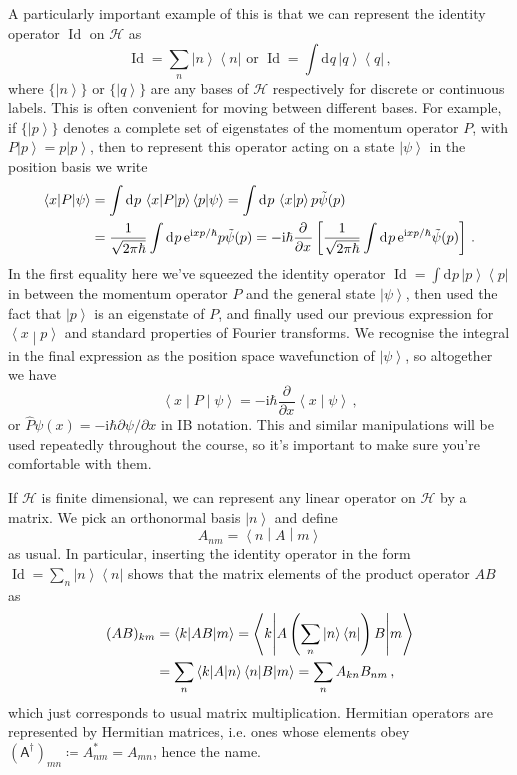 \documentclass{article}
\theoremstyle{plain}\theoremheaderfont{\normalfont\itshape}\theorembodyfont{\rmfamily}\theoremseparator{.}\newtheorem*{rem}{Remark}\newtheorem*{ex}{Example}\newtheorem*{proof}{Proof}\newtheorem*{altp}{Alternative proof}
\theoremstyle{plain}\theoremheaderfont{\normalfont\bfseries}\theorembodyfont{\rmfamily}\theoremseparator{.}\newtheorem{thm}{Theorem}[section]\newtheorem{lem}[thm]{Lemma}\newtheorem{prop}[thm]{Proposition}\newtheorem*{cor}{Corollary}\newtheorem{defn}[thm]{Definition}\newtheorem{clm}[thm]{Claim}\newtheorem{clminproof}{Claim}
\theoremstyle{break}\theoremheaderfont{\normalfont\itshape}\theorembodyfont{\rmfamily}\theoremseparator{.\medskip}\newtheorem*{proofskip}{Proof}\newtheorem*{exs}{Examples}\newtheorem*{rems}{Remarks}
\theoremstyle{break}\theoremheaderfont{\normalfont\bfseries}\theorembodyfont{\rmfamily}\theoremseparator{.\medskip}\newtheorem{lemskip}[thm]{Lemma}\newtheorem{defnskip}[thm]{Definition}\newtheorem{propskip}[thm]{Proposition}\newtheorem{thmskip}[thm]{Theorem}
\numberwithin{equation}{section}
\newcommand{\ii}{\mathrm{i}}
\newcommand{\ee}{\mathrm{e}}
\newcommand{\dd}[2][]{\mathrm{d}^{#1} #2\,}
\newcommand{\pdv}[3][]{\frac{\partial^{#1} #2}{{\partial #3}^{#1}}}
\newcommand{\bra}[1]{\left\langle #1 \right|}
\newcommand{\ket}[1]{\left| #1 \right\rangle}
\newcommand{\braket}[2]{\left\langle #1 \middle| #2 \right\rangle}
\newcommand{\mel}[3]{\left\langle #1 \middle| #2 \middle| #3 \right\rangle}
\newcommand{\hb}{\mathcal{H}}
\DeclareMathOperator{\Id}{Id}
\begin{document}
    A particularly important example of this is that we can represent the identity operator \(\Id\) on \(\hb\) as
    \begin{equation}
        \Id=\sum_n\ket{n}\bra{n}\text{ or }\Id=\int\dd{q}\ket{q}\bra{q}\,,
    \end{equation}
    where \(\{\ket{n}\}\) or \(\{\ket{q}\}\) are any bases of \(\hb\) respectively for discrete or continuous labels. This is often convenient for moving between different bases. For example, if \(\{\ket{p}\}\) denotes a complete set of eigenstates of the momentum operator \(P\), with \(P\ket{p}=p\ket{p}\), then to represent this operator acting on a state \(\ket{\psi}\) in the position basis we write
    \begin{align}
        \mel{x}{P}{\psi}&=\int\dd{p}\mel{x}{P}{p}\braket{p}{\psi}=\int\dd{p}\braket{x}{p}p\tilde{\psi}(p) \notag \\
        &=\frac{1}{\sqrt{2\pi\hbar}}\int\dd{p}\ee^{\ii xp/\hbar}p\tilde{\psi}(p)=-\ii\hbar\pdv{}{x}\left[\frac{1}{\sqrt{2\pi\hbar}}\int\dd{p}\ee^{\ii xp/\hbar}\tilde{\psi}(p)\right]\,.
    \end{align}
    In the first equality here we've squeezed the identity operator \(\Id=\int\dd{p}\ket{p}\bra{p}\) in between the momentum operator \(P\) and the general state \(\ket{\psi}\), then used the fact that \(\ket{p}\) is an eigenstate of \(P\), and finally used our previous expression for \(\braket{x}{p}\) and standard properties of Fourier transforms. We recognise the integral in the final expression as the position space wavefunction of \(\ket{\psi}\), so altogether we have
    \begin{equation}
        \mel{x}{P}{\psi}=-\ii\hbar\pdv{}{x}\braket{x}{\psi}\,,
    \end{equation}
    or \(\hat{P}\psi(x)=-\ii\hbar\partial\psi/\partial x\) in IB notation. This and similar manipulations will be used repeatedly throughout the course, so it's important to make sure you're comfortable with them.

    If \(\hb\) is finite dimensional, we can represent any linear operator on \(\hb\) by a matrix. We pick an orthonormal basis \({\ket{n}}\) and define
    \begin{equation}
        A_{nm}=\mel{n}{A}{m}
    \end{equation}
    as usual. In particular, inserting the identity operator in the form \(\Id=\sum_n\ket{n}\bra{n}\) shows that the matrix elements of the product operator \(AB\) as
    \begin{align}
        (AB)_{km}&=\mel{k}{AB}{m}=\mel{k}{A\left(\sum_n\ket{n}\bra{n}\right)B}{m} \notag\\
        &=\sum_n\mel{k}{A}{n}\mel{n}{B}{m}=\sum_n A_{kn}B_{nm}\,,
    \end{align}
    which just corresponds to usual matrix multiplication. Hermitian operators are represented by Hermitian matrices, i.e. ones whose elements obey \((\mathsf{A}^\dagger)_{mn}\coloneqq A_{nm}^*=A_{mn}\), hence the name.
\end{document}
